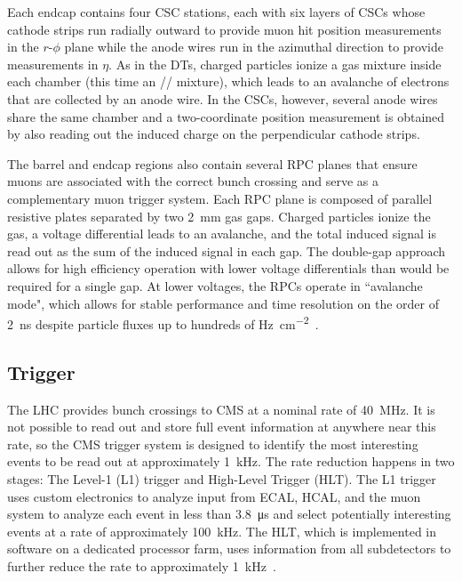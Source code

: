 Each endcap contains four CSC stations, each with six layers of CSCs whose cathode strips run radially outward to provide muon hit position measurements in the $r$-$\phi$ plane while the anode wires run in the azimuthal direction to provide measurements in $\eta$. As in the DTs, charged particles ionize a gas mixture inside each chamber (this time an // mixture), which leads to an avalanche of electrons that are collected by an anode wire. In the CSCs, however, several anode wires share the same chamber and a two-coordinate position measurement is obtained by also reading out the induced charge on the perpendicular cathode strips.

The barrel and endcap regions also contain several RPC planes that ensure muons are associated with the correct bunch crossing and serve as a complementary muon trigger system. Each RPC plane is composed of parallel resistive plates separated by two \SI{2}{\mm} gas gaps. Charged particles ionize the gas, a voltage differential leads to an avalanche, and the total induced signal is read out as the sum of the induced signal in each gap. The double-gap approach allows for high efficiency operation with lower voltage differentials than would be required for a single gap. At lower voltages, the RPCs operate in ``avalanche mode", which allows for stable performance and time resolution on the order of \SI{2}{\ns} despite particle fluxes up to hundreds of \si{\Hz\per\cm\tothe{2}}~\cite{cms_experiment, pdg_2020, rpc_run2}.

\subsection{Trigger}
\label{trigger}
The LHC provides bunch crossings to CMS at a nominal rate of \SI{40}{\MHz}. It is not possible to read out and store full event information at anywhere near this rate, so the CMS trigger system is designed to identify the most interesting events to be read out at approximately \SI{1}{\kHz}. The rate reduction happens in two stages: The Level-1 (L1) trigger and High-Level Trigger (HLT). The L1 trigger uses custom electronics to analyze input from ECAL, HCAL, and the muon system to analyze each event in less than \SI{3.8}{\us} and select potentially interesting events at a rate of approximately \SI{100}{\kHz}. The HLT, which is implemented in software on a dedicated processor farm, uses information from all subdetectors to further reduce the rate to approximately \SI{1}{\kHz}~\cite{cms_experiment, trigger_run2}.

